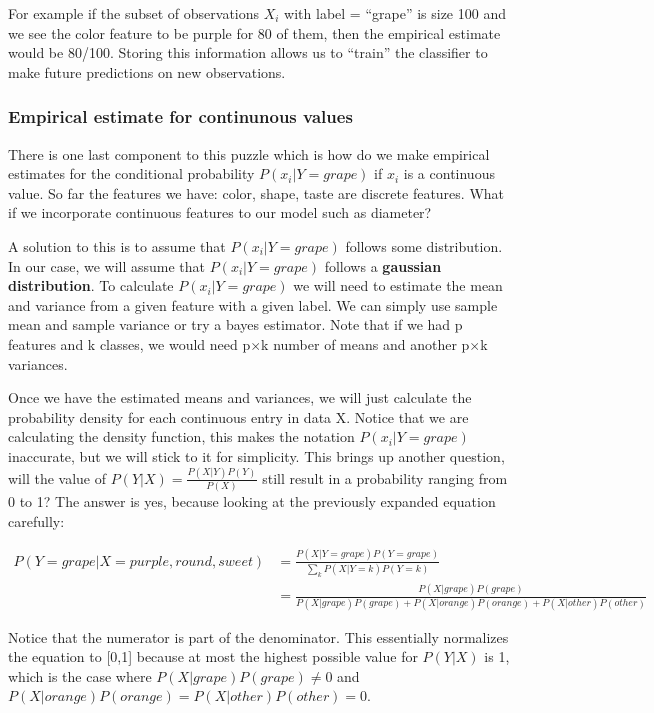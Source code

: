 \documentclass{article}
\begin{document}
For example if the subset of observations $X_{i}$ with label = ``grape'' is size 100 and we see the color feature to be purple for 80 of them, then the empirical estimate would be 80/100. Storing this information allows us to ``train'' the classifier to make future predictions on new observations. 
\subsubsection{Empirical estimate for continunous values}
There is one last component to this puzzle which is how do we make empirical estimates for the conditional probability $P(x_{i}|Y=grape)$ if $x_{i}$ is a continuous value. So far the features we have: color, shape, taste are discrete features. What if we incorporate continuous features to our model such as diameter?\newline

A solution to this is to assume that $P(x_{i}|Y=grape)$ follows some distribution. In our case, we will assume that $P(x_{i}|Y=grape)$ follows a \textbf{gaussian distribution}. To calculate $P(x_{i}|Y=grape)$ we will need to estimate the mean and variance from a given feature with a given label. We can simply use sample mean and sample variance or try a bayes estimator. Note that if we had p features and k classes, we would need p$\times$k number of means and another p$\times$k variances.\newline

Once we have the estimated means and variances, we will just calculate the probability density for each continuous entry in data X. Notice that we are calculating the density function, this makes the notation $P(x_{i}|Y=grape)$ inaccurate, but we will stick to it for simplicity. This brings up another question, will the value of $P(Y|X)=\frac{P(X|Y)P(Y)}{P(X)}$ still result in a probability ranging from 0 to 1? The answer is yes, because looking at the previously expanded equation carefully:

\begin{align*}
P(Y=grape|X=purple,round,sweet) &= \frac{P(X|Y=grape)P(Y=grape)}{\sum_{k} P(X|Y=k)P(Y=k)}\\
&= \frac{P(X|grape)P(grape)}{P(X|grape)P(grape)+P(X|orange)P(orange)+P(X|other)P(other)}
\end{align*}

Notice that the numerator is part of the denominator. This essentially normalizes the equation to [0,1] because at most the highest possible value for $P(Y|X)$ is 1, which is the case where $P(X|grape)P(grape)\neq0$ and $P(X|orange)P(orange)=P(X|other)P(other)=0$. 
\end{document}
